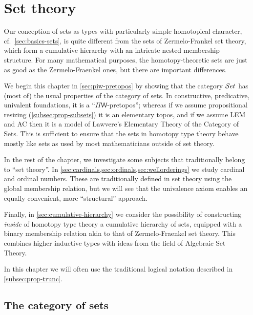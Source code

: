 \chapter{Set theory}
\label{cha:set-math}

Our conception of sets as types with particularly simple homotopical character, cf.\
\autoref{sec:basics-sets}, is quite different from the sets of Zermelo-Frankel set theory, which form a
cumulative hierarchy with an intricate nested membership structure.
For many mathematical purposes, the homotopy-theoretic sets are just as good as
the Zermelo-Fraenkel ones, but there are important differences.

We begin this chapter in \autoref{sec:piw-pretopos} by showing that the category $\mathcal{S}et$ has (most of) the usual properties of the category of sets.
In constructive, predicative, univalent foundations, it is a ``$\Pi\mathsf{W}$-pretopos''; whereas if we assume propositional resizing (\autoref{subsec:prop-subsets}) it is an elementary topos, and if we assume LEM and AC then it is a model of Lawvere's Elementary Theory of the Category of Sets.
This is sufficient to ensure that the sets in homotopy type theory behave mostly like sets as used by most mathematicians outside of set theory.

In the rest of the chapter, we investigate some subjects that traditionally belong to ``set theory''.
In \autoref{sec:cardinals,sec:ordinals,sec:wellorderings} we study cardinal and ordinal numbers.
These are traditionally defined in set theory using the global membership relation, but we will see that the univalence axiom enables an equally convenient, more ``structural'' approach.

Finally, in \autoref{sec:cumulative-hierarchy} we consider the possibility of constructing \emph{inside} of homotopy type theory a cumulative hierarchy of sets, equipped with a binary membership relation akin to that of Zermelo-Fraenkel set theory.
This combines higher inductive types with ideas from the field of Algebraic Set Theory.

In this chapter we will often use the traditional logical notation described in \autoref{subsec:prop-trunc}.

\section{The category of sets}
\label{sec:piw-pretopos}

